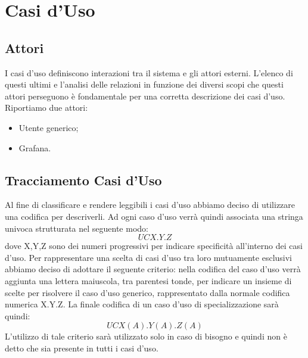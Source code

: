 \section{Casi d'Uso}
		\subsection{Attori}
			I casi d'uso definiscono interazioni tra il sistema e gli attori esterni. L'elenco di questi ultimi e l'analisi delle relazioni in funzione dei diversi scopi che questi attori perseguono è fondamentale per una corretta descrizione dei casi d'uso.
        Riportiamo due attori:
        \begin{itemize}
            \item Utente generico;
            \item Grafana.
        \end{itemize}

		\subsection{Tracciamento Casi d'Uso}
        Al fine di classificare e rendere leggibili i casi d'uso abbiamo deciso di utilizzare una codifica per descriverli. Ad ogni caso d'uso verrà quindi associata una stringa univoca strutturata nel seguente modo:
        \begin{equation}
            UCX.Y.Z    
        \end{equation}
        dove X,Y,Z sono dei numeri progressivi per indicare specificità all'interno dei casi d'uso. \newline
        \newline
        Per rappresentare una scelta di casi d'uso tra loro mutuamente esclusivi abbiamo deciso di adottare il seguente criterio: nella codifica del caso d'uso verrà aggiunta una lettera maiuscola, tra parentesi tonde, per indicare un insieme di scelte per risolvere il caso d'uso generico, rappresentato dalla normale codifica numerica X.Y.Z. La finale codifica di un caso d'uso di specializzazione sarà quindi:
        \begin{equation}
            UCX(A).Y(A).Z(A)
        \end{equation}
        L'utilizzo di tale criterio sarà utilizzato solo in caso di bisogno e quindi non è detto che sia presente in tutti i casi d'uso.
        
